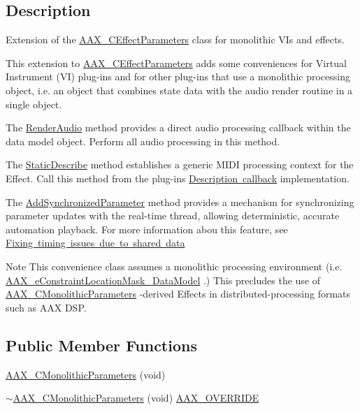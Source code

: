 \subsection{Description}
Extension of the \mbox{\hyperlink{a01481}{A\+A\+X\+\_\+\+C\+Effect\+Parameters}} class for monolithic V\+Is and effects. 

This extension to \mbox{\hyperlink{a01481}{A\+A\+X\+\_\+\+C\+Effect\+Parameters}} adds some conveniences for Virtual Instrument (VI) plug-\/ins and for other plug-\/ins that use a monolithic processing object, i.\+e. an object that combines state data with the audio render routine in a single object.

\begin{DoxyItemize}
\item The \mbox{\hyperlink{a01969_a04f2f73d70ea28c17747c68fc3a20fc8}{Render\+Audio}} method provides a direct audio processing callback within the data model object. Perform all audio processing in this method. \item The \mbox{\hyperlink{a01969_a69f9b80a70ecc6b7b2a7eec372d2502a}{Static\+Describe}} method establishes a generic M\+I\+DI processing context for the Effect. Call this method from the plug-\/in\textquotesingle{}s \mbox{\hyperlink{a00796}{Description callback}} implementation. \item The \mbox{\hyperlink{a01969_a1b23573e8aa3f8e64c61813b721559c2}{Add\+Synchronized\+Parameter}} method provides a mechanism for synchronizing parameter updates with the real-\/time thread, allowing deterministic, accurate automation playback. For more information abou this feature, see \mbox{\hyperlink{a00821_parameterUpdateTiming_sharedData}{Fixing timing issues due to shared data}}\end{DoxyItemize}
\begin{DoxyNote}{Note}
This convenience class assumes a monolithic processing environment (i.\+e. \mbox{\hyperlink{a00491_a0c5d795c1fd021c5b9b541febc34601aa027df08c137702400a92719828bea44b}{A\+A\+X\+\_\+e\+Constraint\+Location\+Mask\+\_\+\+Data\+Model}} .) This precludes the use of \mbox{\hyperlink{a01969}{A\+A\+X\+\_\+\+C\+Monolithic\+Parameters}} -\/derived Effects in distributed-\/processing formats such as A\+AX D\+SP. 
\end{DoxyNote}
\subsection*{Public Member Functions}
\begin{DoxyCompactItemize}
\item 
\mbox{\hyperlink{a01969_a392d2cfd3a182653ab3116e8ee43bf55}{A\+A\+X\+\_\+\+C\+Monolithic\+Parameters}} (void)
\item 
\mbox{\hyperlink{a01969_ae58d71317122d084ff617240a03f0c10}{$\sim$\+A\+A\+X\+\_\+\+C\+Monolithic\+Parameters}} (void) \mbox{\hyperlink{a00392_ac2f24a5172689ae684344abdcce55463}{A\+A\+X\+\_\+\+O\+V\+E\+R\+R\+I\+DE}}
\end{DoxyCompactItemize}
